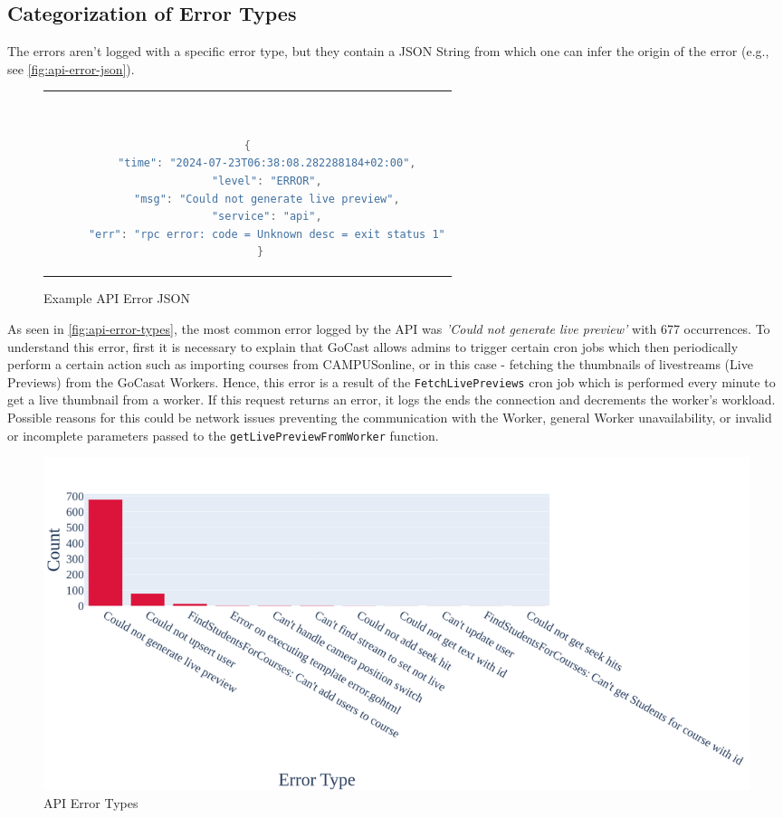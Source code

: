 \subsection{Categorization of Error Types}

The errors aren't logged with a specific error type, but they contain a JSON String from which one can infer the origin of the error (e.g., see \autoref{fig:api-error-json}).

\begin{figure}[htpb]
  \begin{tabular}{c}
  \ \small \begin{lstlisting}[language=Java]
    {
      "time": "2024-07-23T06:38:08.282288184+02:00",
      "level": "ERROR",
      "msg": "Could not generate live preview",
      "service": "api",
      "err": "rpc error: code = Unknown desc = exit status 1"
    }
    \end{lstlisting}
  \end{tabular}
  \caption[Example API Error JSON]{Example API Error JSON}\label{fig:api-error-json}
\end{figure}

As seen in \autoref{fig:api-error-types}, the most common error logged by the \ac{API} was \textit{'Could not generate live preview'} with 677 occurrences. To understand this error, first it is necessary to explain that GoCast allows admins to trigger certain cron jobs which then periodically perform a certain action such as importing courses from CAMPUSonline, or in this case - fetching the thumbnails of livestreams (Live Previews) from the GoCasat Workers. Hence, this error is a result of the \texttt{FetchLivePreviews} cron job which is performed every minute to get a live thumbnail from a worker. If this request returns an error, it logs the  ends the connection and decrements the worker's workload. Possible reasons for this could be network issues preventing the communication with the Worker, general Worker unavailability, or invalid or incomplete parameters passed to the \texttt{getLivePreviewFromWorker} function.

\begin{figure}[htpb]
    \centering
    \includegraphics[width=\linewidth]{images/plots/api/error_types.png}
    \caption[\ac{API} Error Types]{\ac{API} Error Types}\label{fig:api-error-types}
\end{figure}

